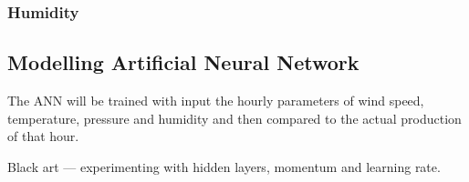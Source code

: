 \subsubsection{Humidity}

\subsection{Modelling Artificial Neural Network}
The ANN will be trained with input the hourly parameters of wind speed, temperature, pressure and humidity and then compared to the actual production of that hour.

Black art --- experimenting with hidden layers, momentum and learning rate. 